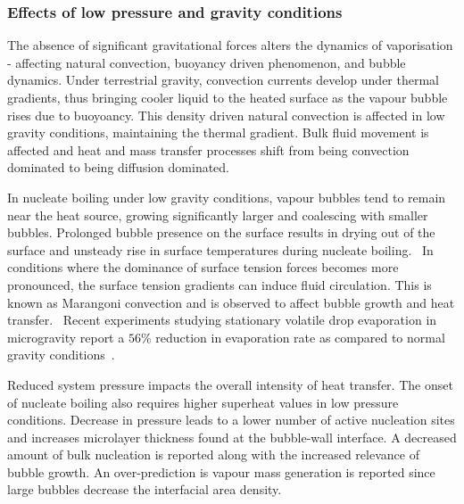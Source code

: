 \subsubsection{Effects of low pressure and gravity conditions}
The absence of significant gravitational forces alters the dynamics of vaporisation - affecting natural convection, buoyancy
 driven phenomenon, and bubble dynamics. Under terrestrial gravity, convection currents develop under thermal
 gradients, thus bringing cooler liquid to the heated surface as the vapour bubble rises due
 to buoyoancy. This density driven natural convection is affected in low gravity conditions, maintaining
 the thermal gradient. Bulk fluid movement is affected and heat and mass transfer processes shift
 from being convection dominated to being diffusion dominated.~\cite{cochranEffectsFluidProperties, leeExperimentalComputationalInvestigation2022}

In nucleate boiling under low gravity conditions, vapour bubbles tend to remain near the heat source, growing
 significantly larger and coalescing with smaller bubbles. Prolonged bubble presence on the
 surface results in drying out of the surface and unsteady rise in surface temperatures during nucleate boiling.\cite{qiuSingleBubbleDynamicsPool2002}~
 In conditions where the dominance of surface tension forces becomes more pronounced,
 the surface tension gradients can induce fluid circulation. This is known as Marangoni
 convection and is observed to affect bubble growth and heat transfer.~\cite{xuNumericalStudyMarangoni2014}
 Recent experiments studying stationary volatile drop evaporation in microgravity
 report a $56\%$ reduction in evaporation rate as compared to normal gravity conditions~\cite{kumarSessileVolatileDrop2020}.

Reduced system pressure impacts the overall intensity of heat transfer. The onset of nucleate boiling also
 requires higher superheat values in low pressure conditions.
 Decrease in pressure leads to a lower number of active nucleation sites and increases
 microlayer thickness found at the bubble-wall interface. A decreased amount of
 bulk nucleation is reported along with the increased relevance of bubble growth. 
 An over-prediction is vapour mass generation is reported since large bubbles decrease
 the interfacial area density.~\cite{serdyukovInfluencePressureLocal2023, zhangExperimentalTheoreticalStudy2002,liaoFlashingEvaporationDifferent2013}

